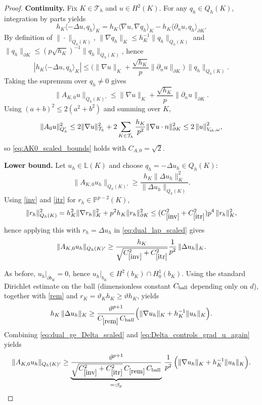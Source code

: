 \documentclass[11pt]{article}
\theoremstyle{definition}
\theoremstyle{plain}
\newcommand{\const}[1]{C_{\eqref{#1}}}
\newcommand{\Vsh}{V_{\!\star \hspace*{-0.2mm}h}}
\newcommand{\tdgonorm}[1]{{\Vert#1\Vert}_{\Vsh,\omega}}
\newcommand{\Th}{{\calT_h}}
\newcommand{\LKh}{\mathbb{L}(K)}
\newcommand{\QKh}{Q_h(K)}
\newcommand{\Qh}{Q_h}
\newcommand{\IP}{\mathbb{P}}
\newcommand{\calT}{\mathcal{T}}
\begin{document}
\begin{proof}
\textbf{Continuity.}
Fix $K\in\Th$ and $u\in H^2(K)$. For any $q_h\in\QKh$, integration by parts yields
\[
h_K\langle-\Delta u,q_h\rangle_K
= h_K\langle\nabla u,\nabla q_h\rangle_K - h_K\langle\partial_n u,q_h\rangle_{\partial K}.
\]
By definition of $\|\cdot\|_{\QKh}$,
$\|\nabla q_h\|_K\le h_K^{-1}\|q_h\|_{\QKh}$ and
$\|q_h\|_{\partial K}\le (p\sqrt{h_K})^{-1}\|q_h\|_{\QKh}$, hence
\[
|h_K\langle-\Delta u,q_h\rangle_K|
\le \Big(\|\nabla u\|_K + \frac{\sqrt{h_K}}{p}\|\partial_n u\|_{\partial K}\Big)\,\|q_h\|_{\QKh}.
\]
Taking the supremum over $q_h\neq0$ gives
\[
\|A_{K,0}u\|_{\QKh'}
\le \|\nabla u\|_K + \frac{\sqrt{h_K}}{p}\|\partial_n u\|_{\partial K}.
\]
Using $(a+b)^2\le 2(a^2+b^2)$ and summing over $K$,
\[
\|A_0 u\|_{\Qh'}^2
\le 2\|\nabla u\|_\Th^2 + 2\sum_{K\in\Th}\frac{h_K}{p^2}\|\nabla u\cdot n\|_{\partial K}^2
\le 2\,\tdgonorm{u}^2,
\]
so \eqref{eq:AK0_scaled_bounds} holds with $C_{A,0}=\sqrt 2$.

\textbf{Lower bound.}
Let $u_h\in\LKh$ and choose $q_h=-\Delta u_h\in\QKh$:
\begin{equation}\label{eq:dual_lap_scaled}
\|A_{K,0}u_h\|_{\QKh'}
\ge \frac{h_K\|\Delta u_h\|_K^2}{\|\Delta u_h\|_{\QKh}}.
\end{equation}
Using \eqref{inv} and \eqref{itr} for $r_h\in\IP^{p-2}(K)$,
\[
    \|r_h\|_{\QKh}^2
=h_K^2\|\nabla r_h\|_K^2+p^2h_K\|r_h\|_{\partial K}^2
\le (\const{inv}^2+\const{itr}^2)p^4\,\|r_h\|_K^2,
\]
hence applying this with $r_h=\Delta u_h$ in \eqref{eq:dual_lap_scaled} gives
\begin{equation}\label{eq:dual_ge_Delta_scaled}
\|A_{K,0}u_h\|_{\QKh'}
\ge
\frac{h_K}{\sqrt{\const{inv}^2+\const{itr}^2}}\frac{1}{p^2}\,\|\Delta u_h\|_K.
\end{equation}

As before, $u_h|_{\partial b_K}=0$, hence $u_h|_{b_K}\in H^2(b_K)\cap H_0^1(b_K)$.
Using the standard Dirichlet estimate on the ball (dimensionless constant $C_{\rm ball}$ depending only on $d$),
together with \eqref{rem} and $r_K=\vartheta_K h_K\ge \vartheta h_K$, yields
\begin{equation}\label{eq:Delta_controls_grad_u_again}
h_K\,\|\Delta u_h\|_{K}
\ge
\frac{\vartheta^{p+1}}{\const{rem}\,C_{\rm ball}}
\Big(\|\nabla u_h\|_{K}+h_K^{-1}\|u_h\|_{K}\Big).
\end{equation}
Combining \eqref{eq:dual_ge_Delta_scaled} and \eqref{eq:Delta_controls_grad_u_again} yields
\begin{equation}\label{eq:A_controls_bulk_again}
\|A_{K,0}u_h\|_{\QKh'}
\ge
\underbrace{\frac{\vartheta^{p+1}}{\sqrt{\const{inv}^2+\const{itr}^2}\,\const{rem}\,C_{\rm ball}}}_{=: \beta_p}\,
\frac{1}{p^2}\,
\Big(\|\nabla u_h\|_{K}+h_K^{-1}\|u_h\|_{K}\Big).
\end{equation}


\end{proof}
\end{document}
